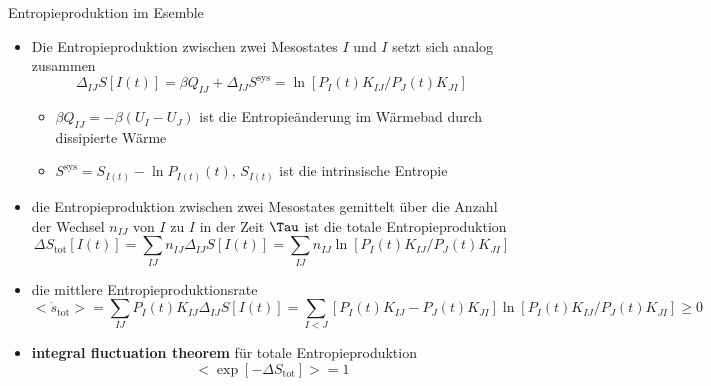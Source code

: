 \documentclass[aspectratio=1610, 9pt]{beamer}
\begin{document}
\begin{frame}{Entropieproduktion im Esemble}%
  \begin{itemize}
    \item Die Entropieproduktion zwischen zwei Mesostates $I$ und $I$ setzt sich analog zusammen
    \begin{equation*}
      \Delta_{IJ} S[I(t)] = \beta Q_{IJ} + \Delta_{IJ} S^\text{sys} = \ln[P_I(t)K_{IJ}/P_J(t)K_{JI}]
    \end{equation*}
    \begin{itemize}
      \item $\beta Q_{IJ}= -\beta \left(U_{I}- U_{J} \right)$ ist die Entropieänderung im Wärmebad durch dissipierte Wärme 
      \item $ S^\text{sys}= S_{I(t)}  - \ln P_{I(t)}(t)$, $S_{I(t)}$ ist die intrinsische Entropie 
    \end{itemize}
    \item die Entropieproduktion zwischen zwei Mesostates gemittelt über die Anzahl der Wechsel $n_{IJ}$ von $I$ zu $I$  in der Zeit $ \Tau$ ist die totale Entropieproduktion
    \begin{equation*}
      \Delta S_\text{tot}[I(t)]= \sum_{IJ} n_{IJ}  \Delta_{IJ} S[I(t)] = \sum_{IJ} n_{IJ}  \ln[P_I(t)K_{IJ}/P_J(t)K_{JI}]
    \end{equation*}
    \item die mittlere Entropieproduktionsrate 
    \begin{equation*}
    <\dot{s}_\text{tot}> = \sum_{IJ} P_I(t)K_{IJ} \Delta_{IJ} S[I(t)] = \sum_{I<J} [P_I(t)K_{IJ}-P_J(t)K_{JI}] \ln[P_I(t)K_{IJ}/P_J(t)K_{JI}] \geq 0
    \end{equation*}
    \item \textbf{ integral fluctuation theorem} für totale Entropieproduktion
    \begin{equation*}
      <\exp[-\Delta S_\text{tot}]> = 1
    \end{equation*}
  \end{itemize}
\end{frame}%
\end{document}
